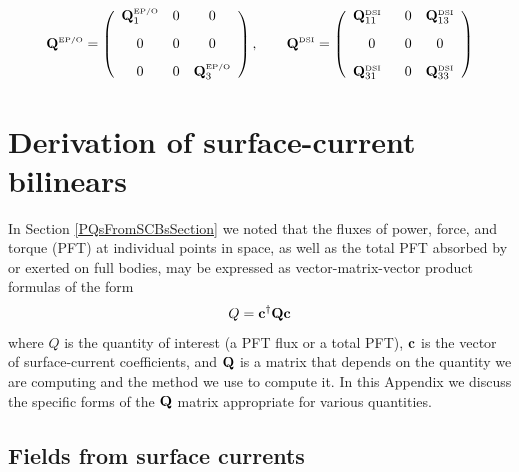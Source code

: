 \documentclass[letterpaper]{article}
\begin{document}
$$ \vb Q\supt{EP/O}
    =
   \left(\begin{array}{ccc}
   \vb Q\supt{EP/O}_{1}
   & 0
   & 0
\\[8pt]
     0
   & 0
   & 0
\\[8pt]
     0 
   & 0
   & \vb Q\supt{EP/O}_{3}
   \end{array}\right), 
\qquad
   \vb Q\supt{DSI}
    =
   \left(\begin{array}{ccc}
   \vb Q\supt{DSI}_{11} 
   \vphantom{\vb Q\supt{EP/O}_1}
   \,\,\,\,
   & 0
   & \vb Q\supt{DSI}_{13}
\\[8pt]
     0
   & 0
   & 0
\\[8pt]
   \vb Q\supt{DSI}_{31} \vphantom{\vb Q\supt{EP/O}_1}
   \,\,\,\,
   & 0
   & \vb Q\supt{DSI}_{33}
   \end{array}\right)
$$

\newpage
\appendix
\section{Derivation of surface-current bilinears}

In Section \ref{PQsFromSCBsSection} we noted that
the fluxes of power, force, and torque (PFT) at
individual points in space, as well as the 
total PFT absorbed by or exerted on full bodies,
may be expressed as vector-matrix-vector product
formulas of the form 
$$ Q = \mathbf{c}^\dagger \mathbf{Q} \mathbf{c}$$
where $Q$ is the quantity of interest (a PFT flux or a total PFT), 
$\mathbf{c}$ is the vector of surface-current coefficients, 
and $\mathbf{Q}$ is a matrix that depends on the quantity we are
computing and the method we use to compute it. In this Appendix  
we discuss the specific forms of the $\mathbf{Q}$ matrix appropriate
for various quantities.

\subsection*{Fields from surface currents}
\end{document}
